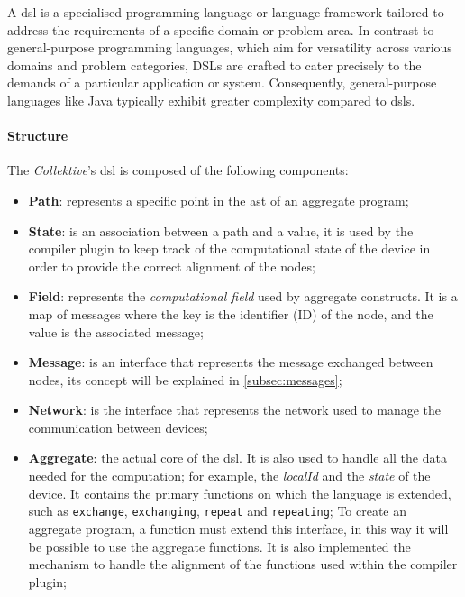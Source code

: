 A \ac{dsl} is a specialised programming language or language framework tailored to address the
requirements of a specific domain or problem area.
In contrast to general-purpose programming languages, which aim for versatility across various domains and problem categories,
DSLs are crafted to cater precisely to the demands of a particular application or system.
Consequently, general-purpose languages like Java typically exhibit greater complexity compared to \acp{dsl}.


\paragraph{Structure}
The \emph{Collektive}'s \ac{dsl} is composed of the following components:
\begin{itemize}
    \item \textbf{Path}: represents a specific point in the \ac{ast} of an aggregate program;
    \item \textbf{State}: is an association between a path and a value, it is used by the compiler plugin to
        keep track of the computational state of the device in order to provide the correct alignment of the nodes;
    \item \textbf{Field}: represents the \emph{computational field} used by aggregate constructs.
        It is a map of messages where the key is the identifier (ID) of the node, and the value is the associated message;
    \item \textbf{Message}: is an interface that represents the message exchanged between nodes, its concept will be explained in \ref{subsec:messages};
    \item \textbf{Network}: is the interface that represents the network used to manage the communication between devices;
    \item \textbf{Aggregate}: the actual core of the \ac{dsl}.
        It is also used to handle all the data needed for the computation; for example, the \emph{localId} and the \emph{state} of the device.
        It contains the primary functions on which the language is extended, such as \texttt{exchange}, \texttt{exchanging}, \texttt{repeat} and \texttt{repeating};
        To create an aggregate program, a function must extend this interface, in this way it will be possible to use the aggregate functions.
        It is also implemented the mechanism to handle the alignment of the functions used within the compiler plugin;

\end{itemize}
